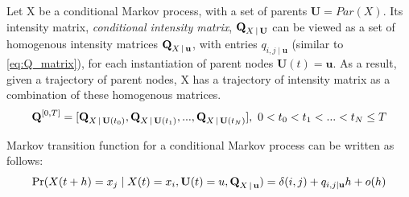 Let X be a conditional Markov process, with a set of parents $ \textbf{U} = Par(X)$. Its intensity matrix, \textit{conditional intensity matrix}, $ \textbf{Q}_{X\,|\, \textbf{U}} $ can be viewed as a set of homogenous intensity matrices $ \textbf{Q}_{X\,|\, \textbf{u}} $, with entries $ q_{i,j \mid \textbf{u}} $ (similar to \autoref{eq:Q_matrix}), for each instantiation of parent nodes $ \textbf{U}(t) =\textbf{u} $.\cite{Nodelman1995} As a result, given a trajectory of parent nodes, X has a trajectory of intensity matrix as a combination of these homogenous matrices.
\begin{equation}
\textbf{Q}^{[0,T]} = [\textbf{Q}_{X\given \textbf{U}(t_0)}, \textbf{Q}_{X\given \textbf{U}(t_1)}, ..., \textbf{Q}_{X\given \textbf{U}(t_N)}],\ 0<t_0<t_1<...<t_N\leq T
\end{equation}

Markov transition function for a conditional Markov process can be written as follows:
\begin{align}
\operatorname{Pr}(X(t + h) = x_j \mid X(t)=x_i, \textbf{U}(t)=u, \textbf{Q}_{X\,|\, \textbf{u}}) = \delta(i,j) + q_{i,j \mid \textbf{u}} h + o(h)
\label{eq:CIM_trans_funct}
\end{align}


